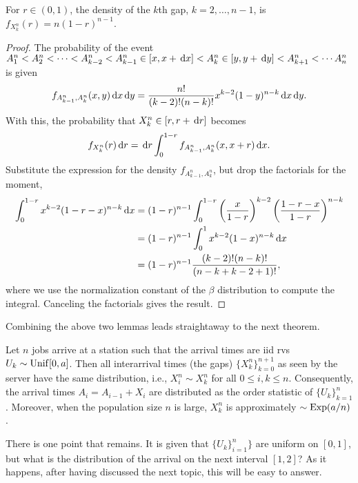 \documentclass[stochastic-or.tex]{subfiles}
\begin{document}
\begin{lemma}
For $r\in (0, 1)$, the density of the $k$th gap, $k=2, \ldots, n-1$,  is $f_{X_{k}^n}(r) = n (1-r)^{n-1}$.
\end{lemma}
\begin{proof}
The probability of the event $A_1^n < A_2^n < \cdots < A_{k-2}^n < A_{k-1}^n \in [x, x+ \,\textrm{d}x] < A_k^n \in [y, y+\,\textrm{d}y] < A_{k+1}^{n} < \cdots A_n^{n}$ is given
\begin{align*}
  f_{A_{k-1}^n, A_k^n}(x, y) \,\textrm{d}x \,\textrm{d}y = \frac{n!}{(k-2)!(n-k)!} x^{k-2} (1-y)^{n-k} \,\textrm{d}x \,\textrm{d}y.
\end{align*}
With this, the probability that $X_k^{n} \in [r, r+\,\textrm{d}r]$ becomes
\begin{align*}
  f_{X_{k}^n}(r) \,\textrm{d}r = \,\textrm{d}r \int_{0}^{1-r}  f_{A_{k-1}^n, A_k^n}(x, x+r) \,\textrm{d}x.
\end{align*}
Substitute the expression for the density $f_{A_{k-1}^n, A_k^n}$, but drop the factorials for the moment,
\begin{align*}
 \int_{0}^{1-r}  x^{k-2} (1-r-x)^{n-k} \,\textrm{d}x
  &= (1-r)^{n-1}\int_0^{1-r} \left(\frac{x}{1-r}\right)^{k-2} \left( \frac{1-r - x}{1-r}\right)^{n-k} \\
  &= (1-r)^{n-1}\int_0^1 x^{k-2}(1-x)^{n-k} \,\textrm{d}x \\
  &= (1-r)^{n-1} \frac{(k-2)!(n-k)!}{(n-k + k-2 + 1)!},
\end{align*}
where we use the normalization constant of  the $\beta$ distribution to compute the integral. Canceling the factorials gives the result.
\end{proof}


Combining the above two lemmas leads straightaway to the next theorem.
\begin{theorem}
Let $n$ jobs arrive at a station such that the arrival times are iid rvs $U_{k}\sim \mathrm{Unif}[0,a]$.
Then all interarrival times (the gaps) $\{X_{k}^{n}\}_{k=0}^{n+1}$ as seen by the server have the same distribution, i.e., $X_i^n \sim X_k^{n}$ for all $0\leq i,k \leq n$.
Consequently, the arrival times $A_{i} = A_{i-1} + X_{i}$ are distributed as the order statistic of $\{U_{k}\}_{k=1}^{n}$. Moreover, when the population size $n$ is large, $X_k^{n}$ is approximately $\sim \mathrm{Exp}(a/n)$.
\end{theorem}

There is one point that remains.
It is given that $\{U_{k}\}_{i=1}^{n}\}$ are uniform on $[0,1]$, but what is the distribution of the arrival on the next interval $[1,2]$?
As it happens, after having discussed the next topic, this will be easy to answer.
\end{document}
